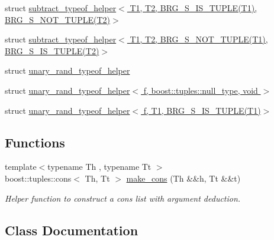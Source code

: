 \begin{DoxyCompactItemize}
\item 
struct \hyperlink{namespaceIceBRG_1_1tuples_structIceBRG_1_1tuples_1_1subtract__typeof__helper_3_01T1_00_01T2_00_01BRG__S__IS__TUPLE_07T1_08131694fe54a3c7a6002fbebfff754799}{subtract\+\_\+typeof\+\_\+helper$<$ T1, T2, B\+R\+G\+\_\+\+S\+\_\+\+I\+S\+\_\+\+T\+U\+P\+L\+E(\+T1), B\+R\+G\+\_\+\+S\+\_\+\+N\+O\+T\+\_\+\+T\+U\+P\+L\+E(\+T2)$>$}
\item 
struct \hyperlink{namespaceIceBRG_1_1tuples_structIceBRG_1_1tuples_1_1subtract__typeof__helper_3_01T1_00_01T2_00_01BRG__S__NOT__TUPLE_07T1_055529bde261c2acf7cf4746a6301cbf1}{subtract\+\_\+typeof\+\_\+helper$<$ T1, T2, B\+R\+G\+\_\+\+S\+\_\+\+N\+O\+T\+\_\+\+T\+U\+P\+L\+E(\+T1), B\+R\+G\+\_\+\+S\+\_\+\+I\+S\+\_\+\+T\+U\+P\+L\+E(\+T2)$>$}
\item 
struct \hyperlink{namespaceIceBRG_1_1tuples_structIceBRG_1_1tuples_1_1unary__rand__typeof__helper}{unary\+\_\+rand\+\_\+typeof\+\_\+helper}
\item 
struct \hyperlink{namespaceIceBRG_1_1tuples_structIceBRG_1_1tuples_1_1unary__rand__typeof__helper_3_01f_00_01boost_1_1tuples_1_1null__type_00_01void_01_4}{unary\+\_\+rand\+\_\+typeof\+\_\+helper$<$ f, boost\+::tuples\+::null\+\_\+type, void $>$}
\item 
struct \hyperlink{structIceBRG_1_1tuples_1_1unary__rand__typeof__helper_3_01f_00_01T1_00_01BRG__S__IS__TUPLE_07T1_08_4}{unary\+\_\+rand\+\_\+typeof\+\_\+helper$<$ f, T1, B\+R\+G\+\_\+\+S\+\_\+\+I\+S\+\_\+\+T\+U\+P\+L\+E(\+T1)$>$}
\end{DoxyCompactItemize}
\subsection*{Functions}
\begin{DoxyCompactItemize}
\item 
{\footnotesize template$<$typename Th , typename Tt $>$ }\\boost\+::tuples\+::cons$<$ Th, Tt $>$ \hyperlink{namespaceIceBRG_1_1tuples_ac21b3a3433cc3c2ee33c4950b92689e6}{make\+\_\+cons} (Th \&\&h, Tt \&\&t)
\begin{DoxyCompactList}\small\item\em Helper function to construct a cons list with argument deduction. \end{DoxyCompactList}\end{DoxyCompactItemize}


\subsection{Class Documentation}
\label{structIceBRG_1_1tuples_1_1add__typeof__helper}
\hypertarget{namespaceIceBRG_1_1tuples_structIceBRG_1_1tuples_1_1add__typeof__helper}{}
